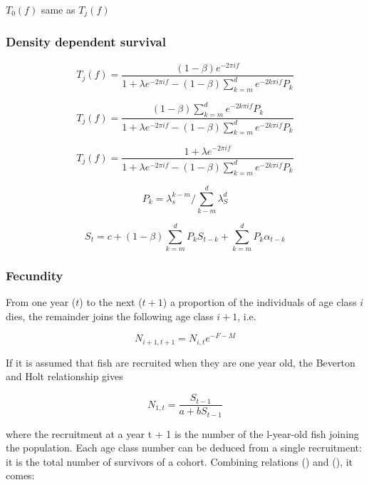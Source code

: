 \documentclass[%
nonumbib,      %
%
]{nrc1}                          %
\begin{document}
$T_0(f)$ same as $T_j(f)$

\subsubsection{Density dependent survival}

\begin{equation}
T_j(f)=\frac{(1 - \beta) e^{-2\pi if}}{1+\lambda e^{-2\pi if}-(1-\beta)\sum\limits_{k=m}^d e^{-2k\pi if} P_k}
\end{equation}

\begin{equation}
T_j(f)=\frac{(1-\beta)\sum\limits_{k=m}^d e^{-2k\pi if} P_k}{1+\lambda e^{-2\pi if}-(1-\beta)\sum\limits_{k=m}^d e^{-2k\pi if} P_k}
\end{equation}

\begin{equation}
T_j(f)=\frac{1+\lambda e^{-2 \pi i f}}{1+\lambda e^{-2\pi if}-(1-\beta)\sum\limits_{k=m}^d e^{-2k\pi if} P_k}
\end{equation}

\begin{equation}
P_k=\lambda_s^{k-m}/\sum\limits_{k-m}^d \lambda^d_{S}
\end{equation}

\begin{equation}
S_t = c + (1-\beta) \sum_{k=m}^d P_k S_{t-k} + \sum_{k=m}^d P_k \alpha_{t-k}
\end{equation}

\subsubsection{Fecundity}

From one year ($t$) to the next ($t+1$) a proportion of the individuals of age class $i$ dies, the remainder joins the following age class $i+1$, i.e.

\begin{equation}
N_{i+1,t+1}=N_{i,t}e^{-F-M}
\end{equation}

If it is assumed that fish are recruited when they are one year old, the Beverton and Holt relationship gives  

\begin{equation}
N_{1,t}=\frac{S_{t-1}}{a+bS_{t-1}} 
\end{equation}

where the recruitment at a year t + 1 is the number of the l-year-old fish joining the population. Each age class number can be deduced from a single recruitment:
it is the total number of survivors of a cohort. Combining relations () and (), it comes:
\end{document}
